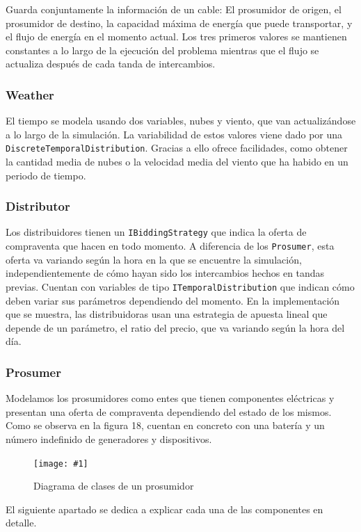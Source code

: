 \documentclass[12pt,a4paper,openright,oneside]{article}
\newcommand{\includeImage}[3]
{
	\begin{figure}[H]
	\begin{center}
	\texttt{[image: \#1]}
	\end{center}
	\caption{#3}
	\end{figure}
}
\numberwithin{equation}{section}
\theoremstyle{definition}
\begin{document}
Guarda conjuntamente la información de un cable: El prosumidor de origen, el prosumidor de destino, la capacidad máxima de energía que puede transportar, y el flujo de energía en el momento actual. Los tres primeros valores se mantienen constantes a lo largo de la ejecución del problema mientras que el flujo se actualiza después de cada tanda de intercambios.

\subsubsection{Weather}

El tiempo se modela usando dos variables, nubes y viento, que van actualizándose a lo largo de la simulación. La variabilidad de estos valores viene dado por una \texttt{DiscreteTemporalDistribution}. Gracias a ello ofrece facilidades, como obtener la cantidad media de nubes o la velocidad media del viento que ha habido en un periodo de tiempo. 

\subsubsection{Distributor}

Los distribuidores tienen un \texttt{IBiddingStrategy} que indica la oferta de compraventa que hacen en todo momento. A diferencia de los \texttt{Prosumer}, esta oferta va variando según la hora en la que se encuentre la simulación, independientemente de cómo hayan sido los intercambios hechos en tandas previas. Cuentan con variables de tipo \texttt{ITemporalDistribution} que indican cómo deben variar sus parámetros dependiendo del momento. En la implementación que se muestra, las distribuidoras usan una estrategia de apuesta lineal que depende de un parámetro, el ratio del precio, que va variando según la hora del día. 

\subsubsection{Prosumer}
Modelamos los prosumidores como entes que tienen componentes eléctricas y presentan una oferta de compraventa dependiendo del estado de los mismos. Como se observa en la figura 18, cuentan en concreto con una batería y un número indefinido de generadores y dispositivos.
\includeImage{modelo_prosumer.png}{10}{Diagrama de clases de un prosumidor}

El siguiente apartado se dedica a explicar cada una de las componentes en detalle.
\end{document}
